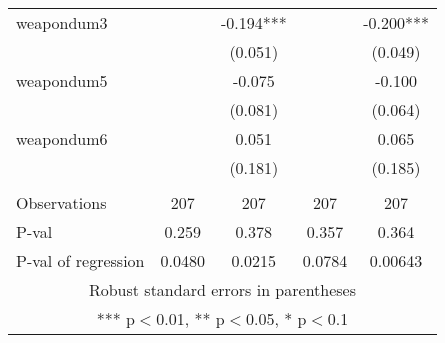 \documentclass[]{article}
\begin{document}
\begin{tabular}{lcccc}
weapondum3 &  & -0.194*** &  & -0.200*** \\
 &  & (0.051) &  & (0.049) \\
weapondum5 &  & -0.075 &  & -0.100 \\
 &  & (0.081) &  & (0.064) \\
weapondum6 &  & 0.051 &  & 0.065 \\
 &  & (0.181) &  & (0.185) \\
 &  &  &  &  \\
Observations & 207 & 207 & 207 & 207 \\
P-val & 0.259 & 0.378 & 0.357 & 0.364 \\
 P-val of regression & 0.0480 & 0.0215 & 0.0784 & 0.00643 \\ \hline
\multicolumn{5}{c}{ Robust standard errors in parentheses} \\
\multicolumn{5}{c}{ *** p$<$0.01, ** p$<$0.05, * p$<$0.1} \\
\end{tabular}
\end{document}
